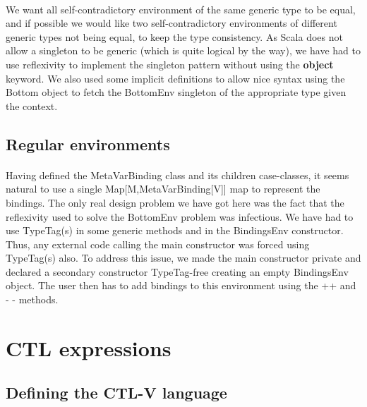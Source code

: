 \documentclass{report}
\begin{document}
\paragraph{}
\hspace{4mm}We want all self-contradictory environment of the same generic type to be equal, and if possible we would like two self-contradictory environments of
different generic types not being equal, to keep the type consistency. As Scala does not allow a singleton to be generic (which is quite logical by the way),
we have had to use reflexivity to implement the singleton pattern without using the \textbf{object} keyword. We also used some implicit definitions to allow nice syntax using 
the Bottom object to fetch the BottomEnv singleton of the appropriate type given the context.

\subsection{Regular environments}

\paragraph{}
\hspace{4mm}Having defined the MetaVarBinding class and its children case-classes, it seems natural to use a single Map[M,MetaVarBinding[V]] map to
represent the bindings. The only real design problem we have got here was the fact that the reflexivity used to solve the BottomEnv problem
was infectious. We have had to use TypeTag(s) in some generic methods and in the BindingsEnv constructor. Thus, any external code
calling the main constructor was forced using TypeTag(s) also. To address this issue, we made the main constructor private and declared a secondary constructor
TypeTag-free creating an empty BindingsEnv object. The user then has to add bindings to this environment using the ++ and - - methods.

\section{CTL expressions}

\subsection{Defining the CTL-V language}
\end{document}
